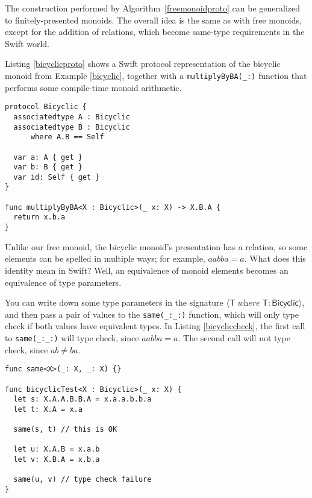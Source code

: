 \documentclass[a4paper,headsepline,bibliography=totoc,toc=flat,fleqn,twoside=semi]{scrbook}
\theoremstyle{definition}
\theoremstyle{definition}
\theoremstyle{definition}
\newcommand{\genericparam}[1]{\bm{\mathsf{#1}}}
\newcommand{\proto}[1]{\bm{\mathsf{#1}}}
\newcommand{\gensig}[2]{\langle #1\;\textit{where}\;#2\rangle}
\begin{document}
The construction performed by Algorithm~\ref{freemonoidproto} can be generalized to finitely-presented monoids. The overall idea is the same as with free monoids, except for the addition of relations, which become same-type requirements in the Swift world.

Listing \ref{bicyclicproto} shows a Swift protocol representation of the bicyclic monoid from Example \ref{bicyclic}, together with a \texttt{multiplyByBA(\_:)} function that performs some compile-time monoid arithmetic.

\begin{listing}\label{bicyclicproto}
\begin{Verbatim}
protocol Bicyclic {
  associatedtype A : Bicyclic
  associatedtype B : Bicyclic
      where A.B == Self
  
  var a: A { get }
  var b: B { get }
  var id: Self { get }
}

func multiplyByBA<X : Bicyclic>(_ x: X) -> X.B.A {
  return x.b.a
}
\end{Verbatim}
\end{listing}
Unlike our free monoid, the bicyclic monoid's presentation has a relation, so some elements can be spelled in multiple ways; for example, $aabba=a$. What does this identity mean in Swift? Well, an equivalence of monoid elements becomes an equivalence of type parameters.

You can write down some type parameters in the signature $\gensig{\genericparam{T}}{\genericparam{T}\colon\proto{Bicyclic}}$, and then pass a pair of values to the \texttt{same(\_:\_:)} function, which will only type check if both values have equivalent types. In Listing \ref{bicycliccheck}, the first call to \texttt{same(\_:\_:)} will type check, since $aabba=a$. The second call will not type check, since $ab\ne ba$.
\begin{listing}\label{bicycliccheck}
\begin{Verbatim}
func same<X>(_: X, _: X) {}

func bicyclicTest<X : Bicyclic>(_ x: X) {
  let s: X.A.A.B.B.A = x.a.a.b.b.a
  let t: X.A = x.a
  
  same(s, t) // this is OK
  
  let u: X.A.B = x.a.b
  let v: X.B.A = x.b.a
  
  same(u, v) // type check failure
}
\end{Verbatim}
\end{listing}
\end{document}
